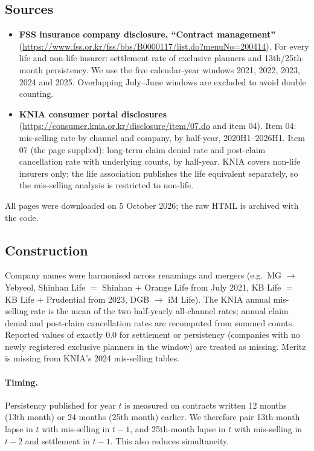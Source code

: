 \documentclass[11pt,a4paper]{article}
\begin{document}
\subsection{Sources}
\begin{itemize}
  \item \textbf{FSS insurance company disclosure, ``Contract management''} (\url{https://www.fss.or.kr/fss/bbs/B0000117/list.do?menuNo=200414}).
        For every life and non-life insurer: settlement rate of exclusive planners and 13th/25th-month persistency.
        We use the five calendar-year windows 2021, 2022, 2023, 2024 and 2025. Overlapping July--June windows
        are excluded to avoid double counting.
  \item \textbf{KNIA consumer portal disclosures} (\url{https://consumer.knia.or.kr/disclosure/item/07.do} and item 04).
        Item 04: mis-selling rate by channel and company, by half-year, 2020H1--2026H1. Item 07 (the page
        supplied): long-term claim denial rate and post-claim cancellation rate with underlying counts, by half-year.
        KNIA covers non-life insurers only; the life association publishes the life equivalent separately, so
        the mis-selling analysis is restricted to non-life.
\end{itemize}
All pages were downloaded on 5 October 2026; the raw HTML is archived with the code.

\subsection{Construction}
Company names were harmonised across renamings and mergers (e.g.\ MG $\to$ Yebyeol, Shinhan Life $=$ Shinhan +
Orange Life from July 2021, KB Life $=$ KB Life + Prudential from 2023, DGB $\to$ iM Life). The KNIA annual
mis-selling rate is the mean of the two half-yearly all-channel rates; annual claim denial and post-claim
cancellation rates are recomputed from summed counts. Reported values of exactly 0.0 for settlement or persistency
(companies with no newly registered exclusive planners in the window) are treated as missing. Meritz is missing
from KNIA's 2024 mis-selling tables.

\paragraph{Timing.} Persistency published for year $t$ is measured on contracts written 12 months (13th month)
or 24 months (25th month) earlier. We therefore pair 13th-month lapse in $t$ with mis-selling in $t-1$, and
25th-month lapse in $t$ with mis-selling in $t-2$ and settlement in $t-1$. This also reduces simultaneity.
\end{document}
